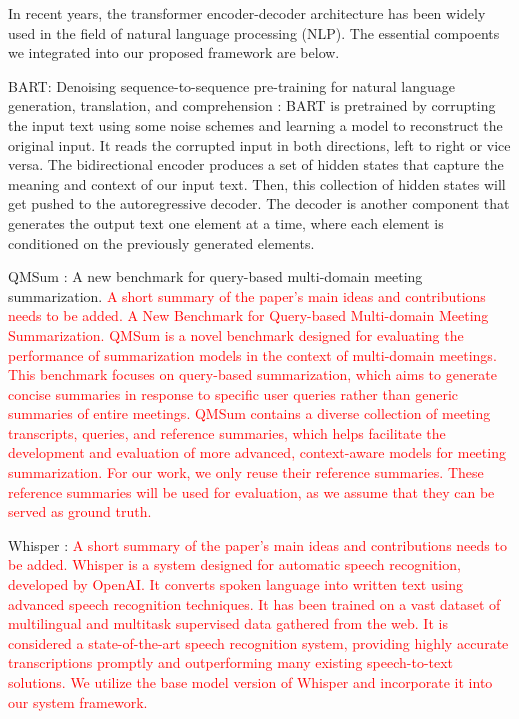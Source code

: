 In recent years, the transformer encoder-decoder architecture has been widely used in the field of natural language processing (NLP). The essential compoents we integrated into our proposed framework are below. 

BART: Denoising sequence-to-sequence pre-training for natural language generation, translation, and comprehension \cite{bart}: BART is pretrained by corrupting the input text using some noise schemes and learning a model to reconstruct the original input. It reads the corrupted input in both directions, left to right or vice versa. The bidirectional encoder produces a set of hidden states that capture the meaning and context of our input text. Then, this collection of hidden states will get pushed to the autoregressive decoder. The decoder is another component that generates the output text one element at a time, where each element is conditioned on the previously generated elements.


QMSum \cite{zhong2021qmsum}: A new benchmark for query-based multi-domain meeting summarization. \textcolor{red}{A short summary of the paper's main ideas and contributions needs to be added. A New Benchmark for Query-based Multi-domain Meeting Summarization. QMSum is a novel benchmark designed for evaluating the performance of summarization models in the context of multi-domain meetings. This benchmark focuses on query-based summarization, which aims to generate concise summaries in response to specific user queries rather than generic summaries of entire meetings. QMSum contains a diverse collection of meeting transcripts, queries, and reference summaries, which helps facilitate the development and evaluation of more advanced, context-aware models for meeting summarization. For our work, we only reuse their reference summaries. These reference summaries will be used for evaluation, as we assume that they can be served as ground truth.}

\vspace{10mm}

Whisper \cite{radford2022robust}: \textcolor{red}{A short summary of the paper's main ideas and contributions needs to be added. Whisper is a system designed for automatic speech recognition, developed by OpenAI. It converts spoken language into written text using advanced speech recognition techniques. It has been trained on a vast dataset of multilingual and multitask supervised data gathered from the web. It is considered a state-of-the-art speech recognition system, providing highly accurate transcriptions promptly and outperforming many existing speech-to-text solutions. We utilize the base model version of Whisper and incorporate it into our system framework.}

